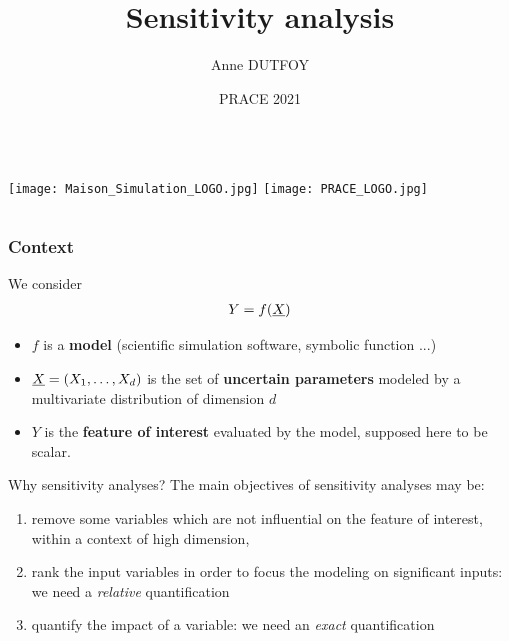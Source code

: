 \documentclass[8pt]{beamer}
\title[Sensitivity analysis]{Sensitivity analysis}
\author[Anne Dutfoy]{
 Anne DUTFOY
}
\institute[]{
 EDF R\&D PERICLES. \\
 anne.dutfoy@edf.Fr
}
\date[PRACE 2021]{PRACE 2021}
\begin{document}

\begin{frame}[plain]
  \begin{columns}
    \titlepage
\begin{center}
\texttt{[image: Maison\_Simulation\_LOGO.jpg]}
\hspace{0.5cm}
\texttt{[image: PRACE\_LOGO.jpg]}
\end{center}
    \vfill
  \end{columns}
\end{frame}






\begin{frame}
  \frametitle{Context}
\small
We consider
\alert{
\begin{align*}
 Y=f({\underline{X}})
\end{align*}
}
\begin{itemize}
  \item $f$ is a {\bf model} (scientific simulation software, symbolic function ...)
  \item ${\underline{X}}=(X_1, \dots, X_d)$ is the set of  {\bf uncertain parameters } modeled by a multivariate distribution of dimension $d$
  \item $Y$ is the {\bf feature of interest} evaluated by the model, supposed here to be scalar.
\end{itemize}

  \begin{block}{Why sensitivity analyses?}
  The main objectives of sensitivity analyses may be:
\begin{enumerate}
 \item \alert{remove some variables} which are not influential on the feature of interest, within a context of high dimension,
 \item\alert{ rank the input variables } in order to focus the modeling on significant inputs: we need a  \emph{relative} quantification
 \item \alert{quantify the impact of a variable}: we need an \emph{exact} quantification
\end{enumerate}
\end{block}
\end{frame}
\end{document}

